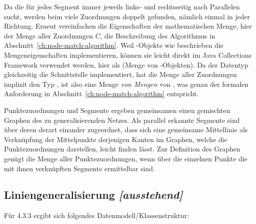 \documentclass[../main/thesis.tex]{subfiles}
\begin{document}
Da die  für jedes Segment immer jeweils links- und rechtsseitig nach Parallelen sucht, werden beim  viele Zuordnungen doppelt gefunden, nämlich einmal in jeder Richtung.
Erneut vereinfachen die Eigenschaften der mathematischen Menge, hier der Menge aller Zuordnungen $C$, die Beschreibung des Algorithmus in Abschnitt~\ref{ch:node-match-algorithm}.
Weil -Objekte wie beschrieben die Mengeneigenschaften implementieren, können sie leicht direkt im Java Collections Framework verwendet werden, hier als  (Menge von -Objekten).
Da der Datentyp  gleichzeitig die Schnittstelle  implementiert, hat die Menge aller Zuordnungen implizit den Typ , ist also eine Menge \emph{von Mengen} von , was genau der formalen Anforderung in Abschnitt~\ref{ch:node-match-algorithm} entspricht.


Punktezuordnungen und Segmente ergeben gemeinsamen einen gemischten Graphen des zu generalisierenden Netzes.
Als parallel erkannte Segmente sind über deren  derart einander zugeordnet, dass sich eine gemeinsame Mittellinie als Verknüpfung der Mittelpunkte derjenigen Kanten im Graphen, welche die Punktezuordnungen darstellen, leicht finden lässt.
Zur Definition des Graphen genügt die Menge aller Punktezuordnungen, wenn über die einzelnen Punkte die mit ihnen verknüpften Segmente ermittelbar sind.




\subsection{Liniengeneralisierung \emph{[ausstehend]}}

Für 4.3.3 ergibt sich folgendes Datenmodell/Klassenstruktur:
\end{document}
